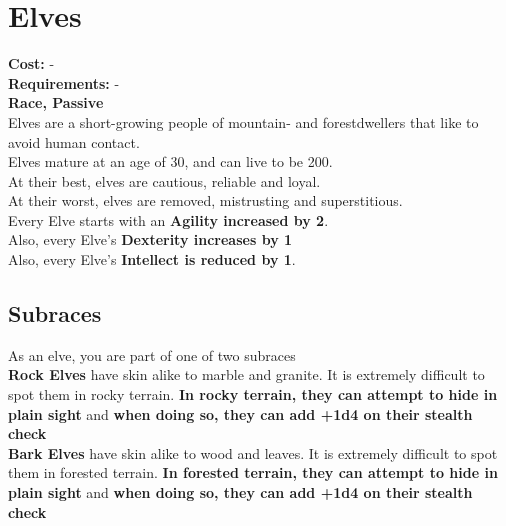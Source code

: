 \section{Elves}
\textbf{Cost:} -\\
\textbf{Requirements:} -\\
\textbf{Race, Passive}\\
Elves are a short-growing people of mountain- and forestdwellers that like to avoid human contact.\\
Elves mature at an age of 30, and can live to be 200.\\
At their best, elves are cautious, reliable and loyal.\\
At their worst, elves are removed, mistrusting and superstitious.\\
Every Elve starts with an \textbf{Agility increased by 2}.\\
Also, every Elve's \textbf{Dexterity increases by 1}\\
Also, every Elve's \textbf{Intellect is reduced by 1}.\\


\subsection{Subraces}
As an elve, you are part of one of two subraces\\

\textbf{Rock Elves} have skin alike to marble and granite. It is extremely difficult to spot them in rocky terrain. \textbf{In rocky terrain, they can attempt to hide in plain sight} and \textbf{when doing so, they can add +1d4 on their stealth check}\\

\textbf{Bark Elves} have skin alike to wood and leaves. It is extremely difficult to spot them in forested terrain. \textbf{In forested terrain, they can attempt to hide in plain sight} and \textbf{when doing so, they can add +1d4 on their stealth check}\\
